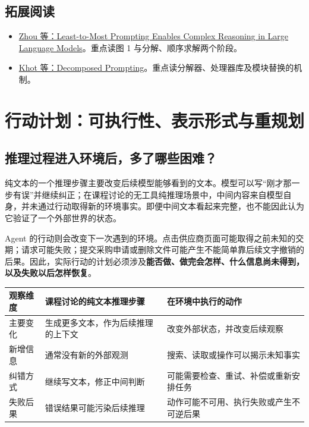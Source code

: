 \documentclass[11pt,a4paper]{article}
\begin{document}
\subsection{拓展阅读}

\begin{itemize}
\item \href{https://arxiv.org/abs/2205.10625}{Zhou 等：Least-to-Most Prompting Enables Complex Reasoning in Large Language Models}。重点读图 1 与分解、顺序求解两个阶段。
\item \href{https://arxiv.org/abs/2210.02406}{Khot 等：Decomposed Prompting}。重点读分解器、处理器库及模块替换的机制。
\end{itemize}

\section{行动计划：可执行性、表示形式与重规划}

\subsection{推理过程进入环境后，多了哪些困难？}

纯文本的一个推理步骤主要改变后续模型能够看到的文本。模型可以写“刚才那一步有误”并继续纠正；在课程讨论的无工具纯推理场景中，中间内容来自模型自身，并未通过行动取得新的环境事实。即便中间文本看起来完整，也不能因此认为它验证了一个外部世界的状态。

Agent 的行动则会改变下一次遇到的环境。点击供应商页面可能取得之前未知的交期；请求可能失败；提交采购申请或删除文件可能产生不能简单靠后续文字撤销的后果。因此，实际行动的计划必须涉及\textbf{能否做、做完会怎样、什么信息尚未得到，以及失败以后怎样恢复}。

\begin{center}
\small
\begin{tabularx}{\textwidth}{L{.18\textwidth}XX}
\toprule
观察维度 & 课程讨论的纯文本推理步骤 & 在环境中执行的动作 \\
\midrule
主要变化 & 生成更多文本，作为后续推理的上下文 & 改变外部状态，并改变后续观察 \\
新增信息 & 通常没有新的外部观测 & 搜索、读取或操作可以揭示未知事实 \\
纠错方式 & 继续写文本，修正中间判断 & 可能需要检查、重试、补偿或重新安排任务 \\
失败后果 & 错误结果可能污染后续推理 & 动作可能不可用、执行失败或产生不可逆后果 \\
\bottomrule
\end{tabularx}
\end{center}
\end{document}
